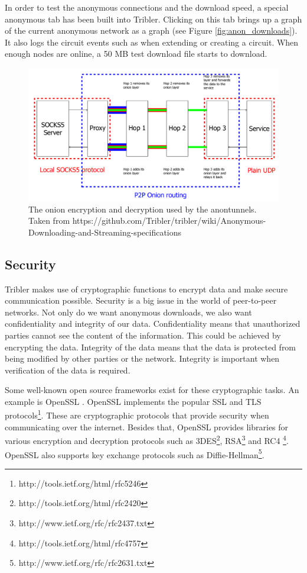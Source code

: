 			In order to test the anonymous connections and the download speed, a special anonymous tab has been built into Tribler. Clicking on this tab brings up a graph of the current anonymous network as a graph (see Figure \ref{fig:anon_downloads}). It also logs the circuit events such as when extending or creating a circuit. When enough nodes are online, a 50 MB test download file starts to download.
			
			\begin{figure}[!htb]
				\centering
				\includegraphics[width=\textwidth]{graphics/onion_encryption_decryption_socks5.png}
				\caption{The onion encryption and decryption used by the anontunnels. Taken from https://github.com/Tribler/tribler/wiki/Anonymous-Downloading-and-Streaming-specifications}
				\label{fig:onion_encryption_decryption_socks5}
			\end{figure}

	\subsection{Security}
	\label{sec:security}
		Tribler makes use of cryptographic functions to encrypt data and make secure communication possible. Security is a big issue in the world of peer-to-peer networks. Not only do we want anonymous downloads, we also want confidentiality and integrity of our data. Confidentiality means that unauthorized parties cannot see the content of the information. This could be achieved by encrypting the data. Integrity of the data means that the data is protected from being modified by other parties or the network. Integrity is important when verification of the data is required.
		
		Some well-known open source frameworks exist for these cryptographic tasks. An example is OpenSSL \cite{openssl}. OpenSSL implements the popular SSL and TLS protocols\footnote{http://tools.ietf.org/html/rfc5246}. These are cryptographic protocols that provide security when communicating over the internet. Besides that, OpenSSL provides libraries for various encryption and decryption protocols such as 3DES\footnote{http://tools.ietf.org/html/rfc2420}, RSA\footnote{http://www.ietf.org/rfc/rfc2437.txt} and RC4 \footnote{http://tools.ietf.org/html/rfc4757}. OpenSSL also supports key exchange protocols such as Diffie-Hellman\footnote{http://www.ietf.org/rfc/rfc2631.txt}.
		
